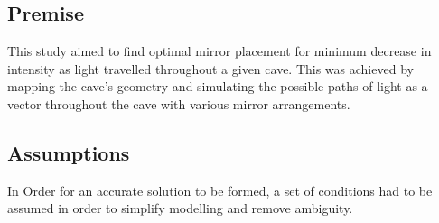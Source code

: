 \documentclass[11pt, letterpaper]{article}
\begin{document}
\subsection{Premise}
This study aimed to find optimal mirror placement for minimum decrease in intensity as light travelled throughout a given cave. This was achieved by mapping the cave's geometry and simulating the possible paths of light as a vector throughout the cave with various mirror arrangements.




\subsection{Assumptions} 
\par

In Order for an accurate solution to be formed, a set of conditions had to be assumed in order to simplify modelling and remove ambiguity.
\end{document}
